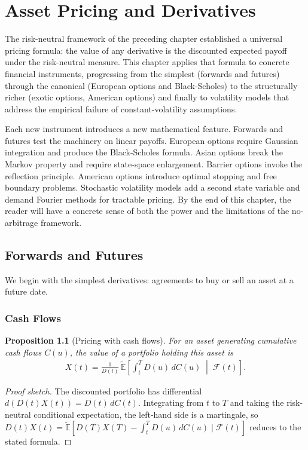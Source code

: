 \documentclass{report}
\theoremstyle{spacedplain}
\newtheorem{proposition}[theorem]{Proposition}
\theoremstyle{spaceddefinition}
\theoremstyle{spacedremark}
\begin{document}
\chapter{Asset Pricing and Derivatives}

The risk-neutral framework of the preceding chapter established a universal pricing formula: the value of any derivative is the discounted expected payoff under the risk-neutral measure. This chapter applies that formula to concrete financial instruments, progressing from the simplest (forwards and futures) through the canonical (European options and Black-Scholes) to the structurally richer (exotic options, American options) and finally to volatility models that address the empirical failure of constant-volatility assumptions.

Each new instrument introduces a new mathematical feature. Forwards and futures test the machinery on linear payoffs. European options require Gaussian integration and produce the Black-Scholes formula. Asian options break the Markov property and require state-space enlargement. Barrier options invoke the reflection principle. American options introduce optimal stopping and free boundary problems. Stochastic volatility models add a second state variable and demand Fourier methods for tractable pricing. By the end of this chapter, the reader will have a concrete sense of both the power and the limitations of the no-arbitrage framework.


\section{Forwards and Futures}

We begin with the simplest derivatives: agreements to buy or sell an asset at a future date.

\subsection{Cash Flows}

\begin{proposition}[Pricing with cash flows]
For an asset generating cumulative cash flows $C(u)$, the value of a portfolio holding this asset is
\begin{align}
    X(t) = \frac{1}{D(t)}\,\widetilde{\mathbb{E}}\!\left[\int_t^T D(u)\,dC(u)\;\middle|\;\mathcal{F}(t)\right].
\end{align}
\end{proposition}

\begin{proof}[Proof sketch]
The discounted portfolio has differential $d(D(t)X(t)) = D(t)\,dC(t)$. Integrating from $t$ to $T$ and taking the risk-neutral conditional expectation, the left-hand side is a martingale, so $D(t)X(t) = \widetilde{\mathbb{E}}[D(T)X(T) - \int_t^T D(u)\,dC(u) \mid \mathcal{F}(t)]$ reduces to the stated formula.
\end{proof}
\end{document}
